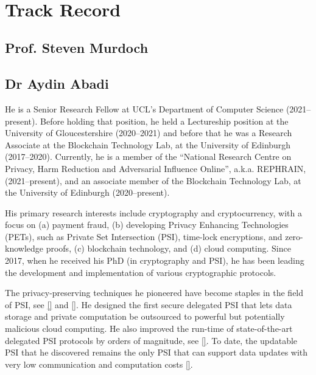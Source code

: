 
\



\section{Track Record}

\subsection{Prof. Steven Murdoch}



\subsection{Dr Aydin Abadi}


He is a Senior Research Fellow at UCL’s Department of Computer Science (2021--present). Before holding that position, he held a Lectureship position at the University of Gloucestershire (2020--2021) and before that he was a Research Associate at the Blockchain Technology Lab, at the University of Edinburgh (2017--2020). Currently, he is a member of the ``National Research Centre on Privacy, Harm Reduction and Adversarial Influence Online'', a.k.a. REPHRAIN, (2021--present), and an associate member of the Blockchain Technology Lab, at the University of Edinburgh (2020--present).

His primary research interests include cryptography and cryptocurrency, with a focus on (a) payment fraud, (b) developing Privacy Enhancing Technologies (PETs), such as Private Set Intersection (PSI), time-lock encryptions, and zero-knowledge proofs, (c) blockchain technology, and (d) cloud computing. Since 2017, when he received his PhD (in cryptography and PSI), he has been leading the development and implementation of various cryptographic protocols. 

The privacy-preserving techniques he pioneered have become staples in the field of PSI, see \href{https://link.springer.com/chapter/10.1007/978-3-319-18467-8_1}{[\printcntr]} and \href{https://link.springer.com/chapter/10.1007/978-3-662-54970-4_9}{[\printcntr]}. He designed the first secure delegated PSI that lets data storage and private computation be outsourced to powerful but potentially malicious cloud computing. He also improved the run-time of state-of-the-art delegated PSI protocols by orders of magnitude, see \href{https://ieeexplore.ieee.org/document/7934388}{[\printcntr]}. To date, the updatable PSI that he discovered remains the only PSI that can support data updates with very low communication and computation costs \href{https://link.springer.com/chapter/10.1007/978-3-031-18283-9_6}{[\printcntr]}.  


